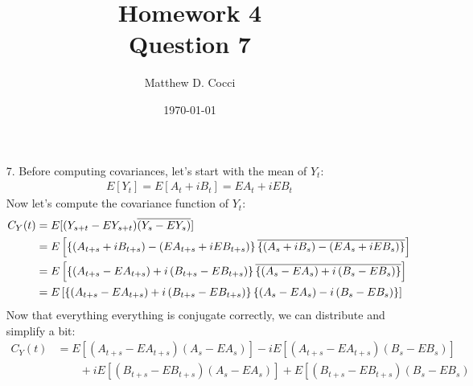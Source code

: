 \documentclass[12pt]{article}
\author{Matthew D. Cocci}
\title{Homework 4 \\ {\normalsize Question 7}}
\date{\today}
\theoremstyle{plain}
\theoremstyle{definition}
\theoremstyle{remark}
\begin{document}
\maketitle


\begin{enumerate}
  \item[7.] %
    Before computing covariances, let's start with the mean of $Y_t$:
    \begin{align*}
      E[Y_t] = E[A_t + iB_t] = EA_t + iEB_t
    \end{align*}
    Now let's compute the covariance function of $Y_t$:
    \begin{align*}
      C_Y(t) &= E[(Y_{s+t}-EY_{s+t})\overline{(Y_s- EY_s)}]\\
      &=
        E\left[
          \left\{
            \left(A_{t+s} + i B_{t+s}\right)
            - \left(EA_{t+s} + i EB_{t+s}\right)
          \right\}
        \overline{%
          \left\{
            \left(A_{s} + i B_{s}\right)
            - \left(EA_{s} + i EB_{s}\right)
          \right\}
        }
        \right]\\
      &=
        E\left[
          \left\{
            \left(A_{t+s} - EA_{t+s}\right)
            + i\left( B_{t+s}- EB_{t+s}\right)
          \right\}
        \overline{%
          \left\{
            \left(A_{s} - EA_{s}\right)
            + i \left( B_{s}- EB_{s}\right)
          \right\}
        }
        \right]\\
      &=
        E\left[
          \left\{
            \left(A_{t+s} - EA_{t+s}\right)
            + i\left( B_{t+s}- EB_{t+s}\right)
          \right\}
          \left\{
            \left(A_{s} - EA_{s}\right)
            - i \left( B_{s}- EB_{s}\right)
          \right\}
        \right]
    \end{align*}
    Now that everything everything is conjugate correctly, we can
    distribute and simplify a bit:
    \begin{align*}
      C_Y(t)
      &=
        E\left[
            \left(A_{t+s} - EA_{t+s}\right)
            \left(A_{s} - EA_{s}\right)
          \right]
        - i E\left[
            \left(A_{t+s} - EA_{t+s}\right)
            \left( B_{s}- EB_{s}\right)
          \right] \\
      &\qquad
        + i E\left[
            \left( B_{t+s}- EB_{t+s}\right)
            \left(A_{s} - EA_{s}\right)
          \right]
        + E\left[
          \left( B_{t+s}- EB_{t+s}\right)
         \left( B_{s}- EB_{s}\right)

\end{align*}
\end{enumerate}
\end{document}
